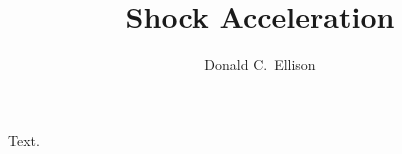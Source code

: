 \documentclass{aipproc}
\begin{document}
\title{Shock Acceleration}
\author{Donald C.~Ellison}
\maketitle
Text.
\end{document}

